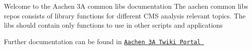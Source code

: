 Welcome to the Aachen 3A common libs documentation The aachen common libs repos consists of library functions for different CMS analysis relevant topics. The libs should contain only functions to use in other scripts and applications

Further documentation can be found in \href{https://twiki.cern.ch/twiki/bin/viewauth/CMS/Aachen3APortal}{\tt Aachen 3A Twiki Portal } 
